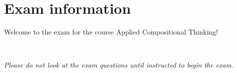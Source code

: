 \documentclass[paper=8.125in:10.250in,pagesize=pdftex,
    headinclude=false,footinclude=false,oneside,egregdoesnotlikesansseriftitles]{kaobook}
\begin{document}
%
%
%
%
%
%
%
%
%
%
%
%
%
%


\section*{Exam information}


Welcome to the exam for the course Applied Compositional Thinking! 

\

\emph{Please do not look at the exam questions until instructed to begin the exam.}

\
\end{document}
